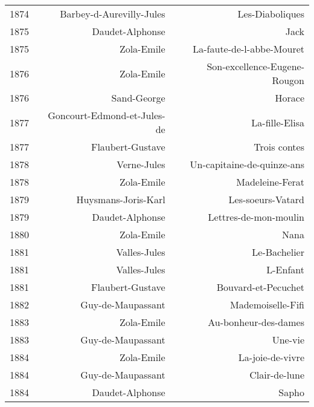 \begin{xltabular}{\textwidth}{lrr}
1874 &             Barbey-d-Aurevilly-Jules &                       Les-Diaboliques \\
1875 &                      Daudet-Alphonse &                                  Jack \\
1875 &                           Zola-Emile &             La-faute-de-l-abbe-Mouret \\
1876 &                           Zola-Emile &          Son-excellence-Eugene-Rougon \\
1876 &                          Sand-George &                                Horace \\
1877 &          Goncourt-Edmond-et-Jules-de &                   La-fille-Elisa \\
1877 &                     Flaubert-Gustave &                  Trois contes \\
1878 &                          Verne-Jules &            Un-capitaine-de-quinze-ans \\
1878 &                           Zola-Emile &                       Madeleine-Ferat \\
1879 &                  Huysmans-Joris-Karl &                     Les-soeurs-Vatard \\
1879 &                      Daudet-Alphonse &                 Lettres-de-mon-moulin \\
1880 &                           Zola-Emile &                                  Nana \\
1881 &                         Valles-Jules &                          Le-Bachelier \\
1881 &                         Valles-Jules &                              L-Enfant \\
1881 &                     Flaubert-Gustave &                   Bouvard-et-Pecuchet \\
1882 &                    Guy-de-Maupassant &                     Mademoiselle-Fifi \\
1883 &                           Zola-Emile &                  Au-bonheur-des-dames \\
1883 &                    Guy-de-Maupassant &                               Une-vie \\
1884 &                           Zola-Emile &                      La-joie-de-vivre \\
1884 &                    Guy-de-Maupassant &                         Clair-de-lune \\
1884 &                      Daudet-Alphonse &                                 Sapho \\

\end{xltabular}
